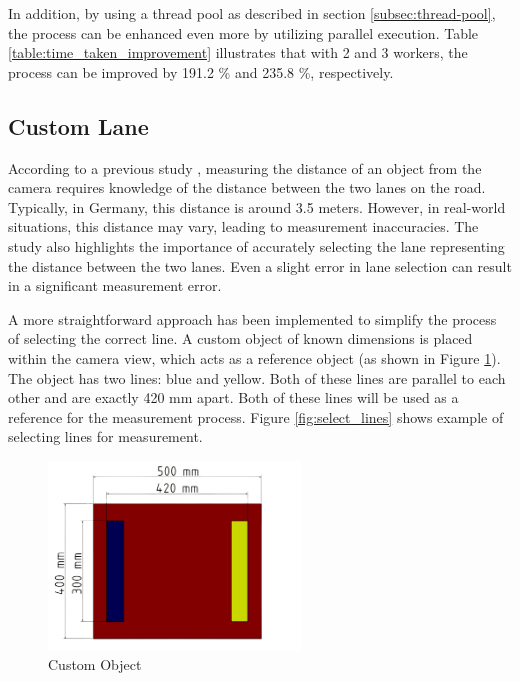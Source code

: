 In addition, by using a thread pool as described in section \ref{subsec:thread-pool}, the process can be enhanced even more by utilizing parallel execution. Table \ref{table:time_taken_improvement} illustrates that with 2 and 3 workers, the process can be improved by 191.2 \% and 235.8 \%, respectively.


\subsection{Custom Lane}
\label{subsec:custom_lane}
According to a previous study \cite{Sabtu_2023}, measuring the distance of an object from the camera requires knowledge of the distance between the two lanes on the road. Typically, in Germany, this distance is around 3.5 meters. However, in real-world situations, this distance may vary, leading to measurement inaccuracies. The study also highlights the importance of accurately selecting the lane representing the distance between the two lanes. Even a slight error in lane selection can result in a significant measurement error.

A more straightforward approach has been implemented to simplify the process of selecting the correct line. A custom object of known dimensions is placed within the camera view, which acts as a reference object (as shown in Figure \ref{fig:custom_object}). The object has two lines: blue and yellow. Both of these lines are parallel to each other and are exactly 420 mm apart. Both of these lines will be used as a reference for the measurement process. Figure \ref{fig:select_lines} shows example of selecting lines for measurement.

\begin{figure}[!ht]
    \centering
    \includegraphics[width=0.6\textwidth]{texs/Part2/chapter4/image/matdimension.png}
    \caption{Custom Object}
    \label{fig:custom_object}
\end{figure}


